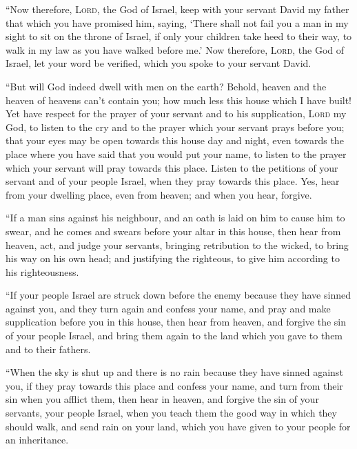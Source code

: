  ``Now therefore, \textsc{Lord}, the God of Israel, keep
with your servant David my father that which you have promised him,
saying, `There shall not fail you a man in my sight to sit on the throne
of Israel, if only your children take heed to their way, to walk in my
law as you have walked before me.'  Now therefore,
\textsc{Lord}, the God of Israel, let your word be verified, which you
spoke to your servant David.

 ``But will God indeed dwell with men on the earth?
Behold, heaven and the heaven of heavens can't contain you; how much
less this house which I have built!  Yet have respect for
the prayer of your servant and to his supplication, \textsc{Lord} my
God, to listen to the cry and to the prayer which your servant prays
before you;  that your eyes may be open towards this
house day and night, even towards the place where you have said that you
would put your name, to listen to the prayer which your servant will
pray towards this place.  Listen to the petitions of your
servant and of your people Israel, when they pray towards this place.
Yes, hear from your dwelling place, even from heaven; and when you hear,
forgive.

 ``If a man sins against his neighbour, and an oath is
laid on him to cause him to swear, and he comes and swears before your
altar in this house,  then hear from heaven, act, and
judge your servants, bringing retribution to the wicked, to bring his
way on his own head; and justifying the righteous, to give him according
to his righteousness.

 ``If your people Israel are struck down before the enemy
because they have sinned against you, and they turn again and confess
your name, and pray and make supplication before you in this house,
 then hear from heaven, and forgive the sin of your
people Israel, and bring them again to the land which you gave to them
and to their fathers.

 ``When the sky is shut up and there is no rain because
they have sinned against you, if they pray towards this place and
confess your name, and turn from their sin when you afflict them,
 then hear in heaven, and forgive the sin of your
servants, your people Israel, when you teach them the good way in which
they should walk, and send rain on your land, which you have given to
your people for an inheritance.

